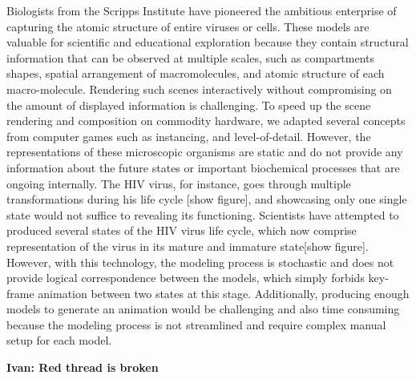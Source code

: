 Biologists from the Scripps Institute have pioneered the ambitious enterprise of capturing the atomic structure of entire viruses or cells.
These models are valuable for scientific and educational exploration because they contain structural information that can be observed at multiple scales, such as compartments shapes, spatial arrangement of macromolecules, and atomic structure of each macro-molecule.
Rendering such scenes interactively without compromising on the amount of displayed information is challenging.
To speed up the scene rendering and composition on commodity hardware, we adapted several concepts from computer games such as instancing, and level-of-detail.
However, the representations of these microscopic organisms are static and do not provide any information about the future states or important biochemical processes that are ongoing internally.
The HIV virus, for instance, goes through multiple transformations during his life cycle [show figure], and showcasing only one single state would not suffice to revealing its functioning.
Scientists have attempted to produced several states of the HIV virus life cycle, which now comprise representation of the virus in its mature and immature state[show figure].
However, with this technology, the modeling process is stochastic and does not provide logical correspondence between the models, which simply forbids key-frame animation between two states at this stage.
Additionally, producing enough models to generate an animation would be challenging and also time consuming because the modeling process is not streamlined and require complex manual setup for each model.

\textbf{Ivan: Red thread is broken}

